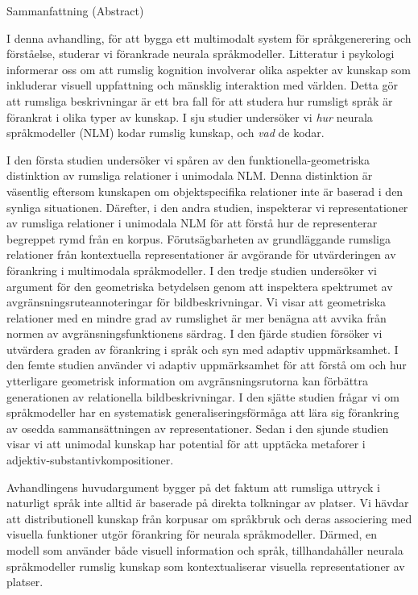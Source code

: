 \clearpage
{ Sammanfattning (Abstract)}
\label{sec:abstract:abstract-svenska} 

I denna avhandling, för att bygga ett multimodalt system för språkgenerering och förståelse, studerar vi förankrade neurala språkmodeller.
Litteratur i psykologi informerar oss om att rumslig kognition involverar olika aspekter av kunskap som inkluderar visuell uppfattning och mänsklig interaktion med världen. Detta gör att rumsliga beskrivningar är ett bra fall för att studera hur rumsligt språk är förankrat i olika typer av kunskap.
I sju studier undersöker vi \emph{hur} neurala språkmodeller (NLM) kodar rumslig kunskap, och \emph{vad} de kodar.

I den första studien undersöker vi spåren av den funktionella-geometriska distinktion av rumsliga relationer i unimodala NLM.
Denna distinktion är väsentlig eftersom kunskapen om objektspecifika relationer inte är baserad i den synliga situationen.
Därefter, i den andra studien, inspekterar vi representationer av rumsliga relationer i unimodala NLM för att förstå hur de representerar begreppet rymd från en korpus.
Förutsägbarheten av grundläggande rumsliga relationer från kontextuella representationer är avgörande för utvärderingen av förankring i multimodala språkmodeller.
I den tredje studien undersöker vi argument för den geometriska betydelsen genom att inspektera spektrumet av avgränsningsruteannoteringar för bildbeskrivningar.
Vi visar att geometriska relationer med en mindre grad av rumslighet är mer benägna att avvika från normen av avgränsningsfunktionens särdrag.
I den fjärde studien försöker vi utvärdera graden av förankring i språk och syn med adaptiv uppmärksamhet.
I den femte studien använder vi adaptiv uppmärksamhet för att förstå om och hur ytterligare geometrisk information om avgränsningsrutorna kan förbättra generationen av relationella bildbeskrivningar.
I den sjätte studien frågar vi om språkmodeller har en systematisk generaliseringsförmåga att lära sig förankring av osedda sammansättningen av representationer.
Sedan i den sjunde studien visar vi att unimodal kunskap har potential för att upptäcka metaforer i adjektiv-substantivkompositioner.

Avhandlingens huvudargument bygger på det faktum att rumsliga uttryck i naturligt språk inte alltid är baserade på direkta tolkningar av platser.
Vi hävdar att distributionell kunskap från korpusar om språkbruk och deras associering med visuella funktioner utgör förankring för neurala språkmodeller.
Därmed, en modell som använder både visuell information och språk, tillhandahåller neurala språkmodeller rumslig kunskap som kontextualiserar visuella representationer av platser.


